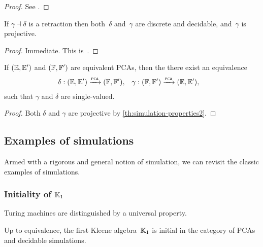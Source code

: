 \begin{proof}
  See \cite[Theorem 2.5.3]{Longley:94}.
\end{proof}

\begin{corollary}
  \label{th:simulation-properties}%
  If $\gamma \dashv \delta$ is a retraction then both~$\delta$
  and~$\gamma$ are discrete and decidable, and~$\gamma$ is projective.
\end{corollary}

\begin{proof}
  Immediate. This is~\cite[Corollary 2.5.4]{Longley:94}.
\end{proof}

\begin{corollary}
  \label{th:simulation-properties-more}%
  If $({\mathbb{E}}, {\mathbb{E}'})$ and $({\mathbb{F}}, {\mathbb{F}'})$ are equivalent PCAs, then the 
  there exist an equivalence
  \begin{align*}
    \delta &: ({\mathbb{E}}, {\mathbb{E}'}) \xrightarrow{\scriptscriptstyle\mathsf{PCA}}{} ({\mathbb{F}}, {\mathbb{F}'}),
    &
    \gamma &: ({\mathbb{F}}, {\mathbb{F}'}) \xrightarrow{\scriptscriptstyle\mathsf{PCA}}{} ({\mathbb{E}}, {\mathbb{E}'}),
  \end{align*}
  such that $\gamma$ and $\delta$ are single-valued.
\end{corollary}

\begin{proof}
  Both $\delta$ and $\gamma$ are projective by
  \cref{th:simulation-properties2}.
\end{proof}

\subsection{Examples of simulations}
\label{sec:examples-simulations}

Armed with a rigorous and general notion of simulation, we can revisit the classic examples of simulations.

\subsubsection{Initiality of $\mathbb{K}_1$}
\label{ex:intiality-K1}%

Turing machines are distinguished by a universal property.

\begin{theorem}
  Up to equivalence, the first Kleene algebra~$\mathbb{K}_1$ is initial in the category of PCAs and decidable simulations.
\end{theorem}

